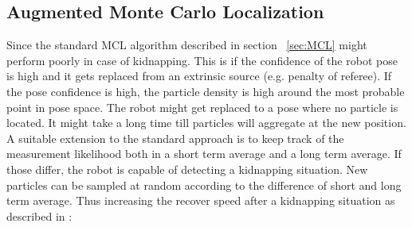 \documentclass[	DIV=calc,%
							paper=a4,%
							fontsize=9pt,%
							twocolumn]{scrartcl}	 					%
\begin{document}
\subsection{Augmented Monte Carlo Localization}
\label{sec:AMCL}

Since the standard MCL algorithm described in section ~\ref{sec:MCL} might perform poorly in case of kidnapping.
This is if the confidence of the robot pose is high and it gets replaced from an extrinsic source (e.g. penalty of referee). If the pose confidence is high, the particle density is high around the most probable point in pose space. The robot might get replaced to a pose where no particle is located. It might take a long time till particles will aggregate at the new position. 
A suitable extension to the standard approach is to keep track of the measurement likelihood both in a short term average and a long term average.
If those differ, the robot is capable of detecting a kidnapping situation. New particles can be sampled at random according to the difference of short and long term average. Thus increasing the recover speed after a kidnapping situation as described in \cite{ProbabilisticRobotsics}:\\
\end{document}
